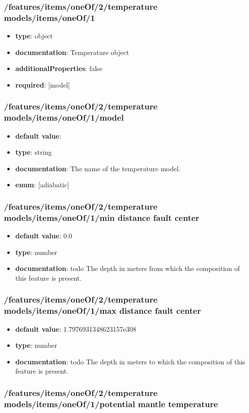 \subsubsection{/features/items/oneOf/2/temperature models/items/oneOf/1}
\begin{itemize}\item {\bf type}: object
\item {\bf documentation}: Temperature object
\item {\bf additionalProperties}: false
\item {\bf required}: [model]\end{itemize}
\subsubsection{/features/items/oneOf/2/temperature models/items/oneOf/1/model}
\begin{itemize}\item {\bf default value}: 
\item {\bf type}: string
\item {\bf documentation}: The name of the temperature model.
\item {\bf enum}: [adiabatic]\end{itemize}\subsubsection{/features/items/oneOf/2/temperature models/items/oneOf/1/min distance fault center}
\begin{itemize}\item {\bf default value}: 0.0
\item {\bf type}: number
\item {\bf documentation}: todo The depth in meters from which the composition of this feature is present.
\end{itemize}\subsubsection{/features/items/oneOf/2/temperature models/items/oneOf/1/max distance fault center}
\begin{itemize}\item {\bf default value}: 1.7976931348623157e308
\item {\bf type}: number
\item {\bf documentation}: todo The depth in meters to which the composition of this feature is present.
\end{itemize}\subsubsection{/features/items/oneOf/2/temperature models/items/oneOf/1/potential mantle temperature}
